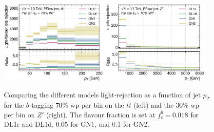 \begin{figure}[h!]
  \centering
  \includegraphics[width=0.48\textwidth]{Images/FTAG/GN/GN2/pt_plots/pt_ttbar_flat_light_rej.png}
  \includegraphics[width=0.48\textwidth]{Images/FTAG/GN/GN2/pt_plots/pt_zp_flat_light_rej.png}
  \caption{Comparing the different models light-rejection as a function of jet $p_T$ for the $b$-tagging 70\% \gls{wp} per bin on the $t\bar{t}$ (left) and the 30\% \gls{wp} per bin on $Z'$ (right). The flavour fraction is set at $f^b_c = 0.018$ for DL1r and DL1d, 0.05 for GN1, and 0.1 for GN2.}
  \label{fig:GNxptb_urejflat}
\end{figure} 


